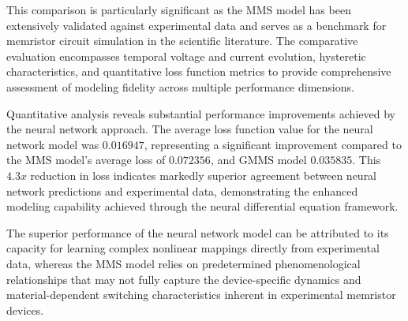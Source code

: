 \documentclass[11pt, oneside]{article}
\begin{document}
This comparison is particularly significant as the MMS model has been extensively validated against experimental data and serves as a benchmark for memristor circuit simulation in the scientific literature. The comparative evaluation encompasses temporal voltage and current evolution, hysteretic characteristics, and quantitative loss function metrics to provide comprehensive assessment of modeling fidelity across multiple performance dimensions.

Quantitative analysis reveals substantial performance improvements achieved by the neural network approach. The average loss function value for the neural network model was $0.016947$, representing a significant improvement compared to the MMS model's average loss of $0.072356$, and GMMS model $0.035835$. This $4.3x$ reduction in loss indicates markedly superior agreement between neural network predictions and experimental data, demonstrating the enhanced modeling capability achieved through the neural differential equation framework.

The superior performance of the neural network model can be attributed to its capacity for learning complex nonlinear mappings directly from experimental data, whereas the MMS model relies on predetermined phenomenological relationships that may not fully capture the device-specific dynamics and material-dependent switching characteristics inherent in experimental memristor devices.
\end{document}
